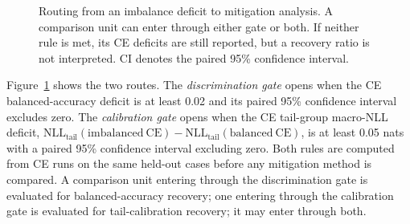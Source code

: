 \documentclass[11pt]{article}
\begin{document}
\begin{figure}[H]
  \centering
  \caption{Routing from an imbalance deficit to mitigation analysis. A comparison unit can enter through either gate or both. If neither rule is met, its CE deficits are still reported, but a recovery ratio is not interpreted. CI denotes the paired 95\% confidence interval.}
  \label{fig:gate-routing}
\end{figure}

Figure~\ref{fig:gate-routing} shows the two routes. The \emph{discrimination gate} opens when the CE balanced-accuracy deficit is at least \num{0.02} and its paired 95\% confidence interval excludes zero. The \emph{calibration gate} opens when the CE tail-group macro-NLL deficit, $\mathrm{NLL}_{\mathrm{tail}}(\mathrm{imbalanced\ CE})-\mathrm{NLL}_{\mathrm{tail}}(\mathrm{balanced\ CE})$, is at least \num{0.05} nats with a paired 95\% confidence interval excluding zero. Both rules are computed from CE runs on the same held-out cases before any mitigation method is compared. A comparison unit entering through the discrimination gate is evaluated for balanced-accuracy recovery; one entering through the calibration gate is evaluated for tail-calibration recovery; it may enter through both.
\end{document}
